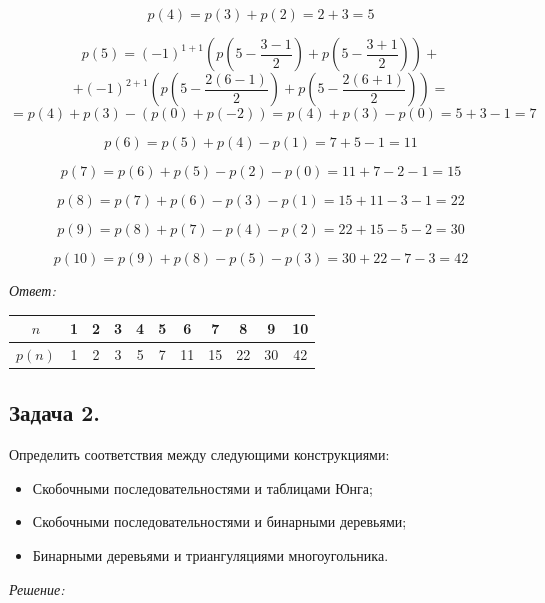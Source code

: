 \begin{itemize}
	\[ p(4) = p(3) + p(2) = 2 + 3 = 5 \]
	
	\[ p(5) = (-1)^{1 + 1} \left(p\left(5-\frac{3-1}{2}\right) + p\left(5-\frac{3+1}{2}\right)\right)+ \]
	\[ + (-1)^{2+1} \left( p\left(5 - \frac{2(6-1)}{2}\right) + p\left(5-\frac{2(6+1)}{2}\right) \right) = \]
	\[ =p(4) + p(3) - (p(0)+p(-2)) = p(4) + p(3) - p(0) = 5 + 3 - 1 = 7 \]
	
	\[ p(6) = p(5) + p(4) - p(1) = 7 + 5 - 1 = 11 \]
	
	\[ p(7) = p(6) + p(5) - p(2) - p(0) = 11 + 7 - 2 - 1 = 15 \]
	
	\[ p(8) = p(7) + p(6) - p(3) - p(1) = 15 + 11 - 3 - 1 = 22 \]
	
	\[ p(9) = p(8) + p(7) - p(4) - p(2) = 22 + 15 - 5 - 2 = 30 \]
	
	\[ p(10) = p(9) + p(8) - p(5) - p(3) = 30 + 22 - 7 - 3 = 42 \]
\end{itemize}

\noindent\textit{Ответ:}

\begin{table}[h]
	\centering
	\begin{tabular}{|c|c|c|c|c|c|c|c|c|c|c|}
		\hline
		$n$    & 1 & 2 & 3 & 4 & 5 & 6  & 7  & 8  & 9  & 10 \\ \hline
		$p(n)$ & 1 & 2 & 3 & 5 & 7 & 11 & 15 & 22 & 30 & 42 \\ \hline
	\end{tabular}
\end{table}

\subsection*{Задача 2.}

Определить соответствия между следующими конструкциями:

\begin{itemize}
	\item Скобочными последовательностями и таблицами Юнга;
	\item Скобочными последовательностями и бинарными деревьями;
	\item Бинарными деревьями и триангуляциями многоугольника.
\end{itemize}

\noindent\textit{Решение:}

